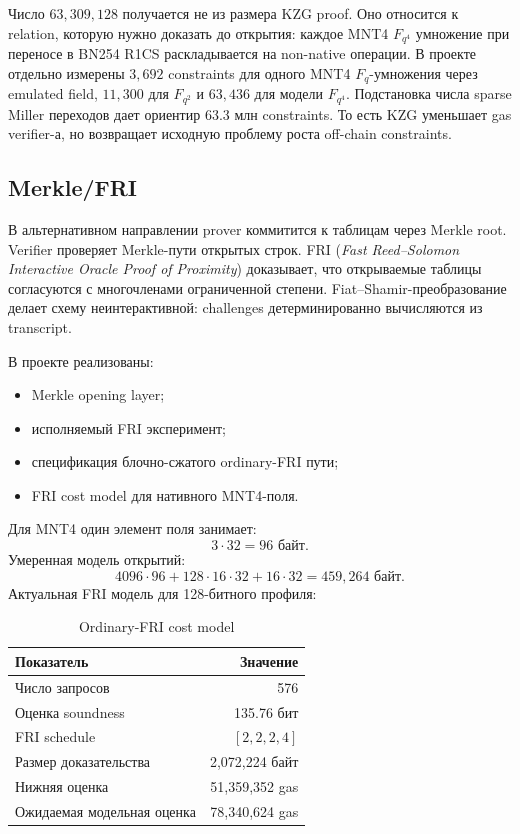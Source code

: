 \documentclass[12pt,a4paper]{article}
\begin{document}
Число $63{,}309{,}128$ получается не из размера KZG proof. Оно относится к
relation, которую нужно доказать до открытия: каждое MNT4 $F_{q^4}$
умножение при переносе в BN254 R1CS раскладывается на non-native операции.
В проекте отдельно измерены $3{,}692$ constraints для одного MNT4
$F_q$-умножения через emulated field, $11{,}300$ для $F_{q^2}$ и
$63{,}436$ для модели $F_{q^4}$. Подстановка числа sparse Miller
переходов дает ориентир $63.3$ млн constraints. То есть KZG уменьшает
gas verifier-а, но возвращает исходную проблему роста off-chain constraints.

\subsection{Merkle/FRI}

В альтернативном направлении prover коммитится к таблицам через Merkle root.
Verifier проверяет Merkle-пути открытых строк. FRI
(\emph{Fast Reed--Solomon Interactive Oracle Proof of Proximity}) доказывает,
что открываемые таблицы согласуются с многочленами ограниченной степени.
Fiat--Shamir-преобразование делает схему неинтерактивной: challenges
детерминированно вычисляются из transcript.

В проекте реализованы:
\begin{itemize}
    \item Merkle opening layer;
    \item исполняемый FRI эксперимент;
    \item спецификация блочно-сжатого ordinary-FRI пути;
    \item FRI cost model для нативного MNT4-поля.
\end{itemize}

Для MNT4 один элемент поля занимает:
\[
    3\cdot 32=96\text{ байт}.
\]
Умеренная модель открытий:
\[
    4096\cdot96+128\cdot16\cdot32+16\cdot32
    =459{,}264\text{ байт}.
\]
Актуальная FRI модель для 128-битного профиля:

\begin{table}[htbp]
\centering
\caption{Ordinary-FRI cost model}
\small
\begin{tabular}{l r}
\toprule
Показатель & Значение \\
\midrule
Число запросов & 576 \\
Оценка soundness & 135.76 бит \\
FRI schedule & $[2,2,2,4]$ \\
Размер доказательства & 2,072,224 байт \\
Нижняя оценка & 51,359,352 gas \\
Ожидаемая модельная оценка & 78,340,624 gas \\
\bottomrule
\end{tabular}
\end{table}
\end{document}
